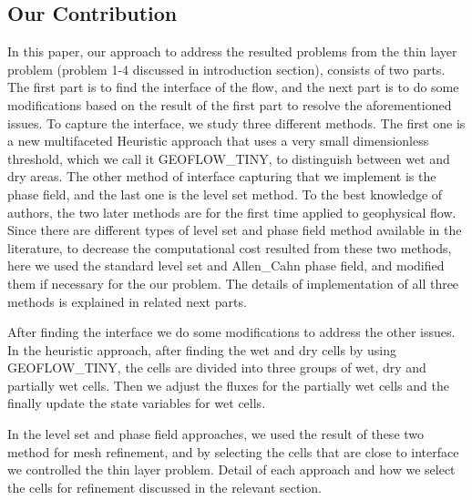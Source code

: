 \documentclass[letterpaper,10pt]{article}
\begin{document}
\subsection{Our Contribution}
In this paper, our approach to address the resulted problems from the thin layer problem (problem 1-4 discussed in introduction section), consists of two parts. The first part is to find the interface of the flow, and the next part is to do some modifications based on the result of the first part to resolve the aforementioned issues.
To capture the interface, we study three different methods. The first one is a new multifaceted Heuristic approach that uses a very small dimensionless threshold, which we call it GEOFLOW\_TINY, to distinguish between wet and dry areas. The other method of interface capturing that we implement is the phase field, and the last one is the level set method. To the best knowledge of authors, the two later methods  are for the first time applied to geophysical flow. Since there are different types of level set and phase field method available in the literature, to decrease the computational cost resulted from these two methods, here we used the standard level set and Allen\_Cahn phase field, and modified them if necessary for the our problem. The details of implementation of all three methods is explained in related next parts.

After finding the interface we do some modifications to address the other issues. In the heuristic approach, after finding the wet and dry cells by using GEOFLOW\_TINY, the cells are divided into three groups of wet, dry and partially wet cells. Then we  adjust the fluxes for the partially wet cells and the finally update the state variables for wet cells.

In the level set and phase field approaches, we used the result of these two method for mesh refinement, and by selecting the cells that are close to interface we controlled the thin layer problem. Detail of each approach and how we select the cells for refinement discussed in the relevant section.
\end{document}
